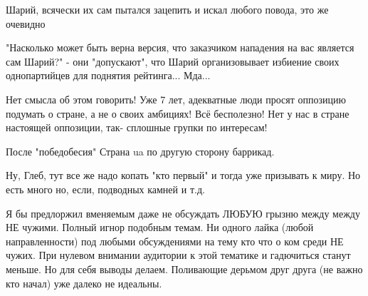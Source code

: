 \begin{itemize}
 
Шарий, всячески их сам пытался зацепить и искал любого повода, это же очевидно 🙈

 

"Насколько может быть верна версия, что заказчиком нападения на вас является
сам Шарий?" - они "допускают", что Шарий организовывает избиение своих
однопартийцев для поднятия рейтинга... Мда...


 

Нет смысла об этом говорить! Уже 7 лет, адекватные люди просят оппозицию
подумать о стране, а не о своих амбициях! Всё бесполезно! Нет у нас в стране
настоящей оппозиции, так- сплошные групки по интересам!


 

После "победобесия" Страна ua по другую сторону баррикад.


 

Ну, Глеб, тут все же надо копать "кто первый" и тогда уже призывать к миру. Но
есть много но, если, подводных камней и т.д.


Я бы предлоржил вменяемым даже не обсуждать ЛЮБУЮ грызню между между НЕ чужими.
Полный игнор подобным темам.
Ни одного лайка (любой направленности) под любыми обсуждениями на тему кто что о ком среди НЕ чужих.
При нулевом внимании аудитории к этой тематике и гадючиться станут меньше.
Но для себя выводы делаем.
Поливающие дерьмом друг друга (не важно кто начал) уже далеко не идеальны.


\end{itemize}
